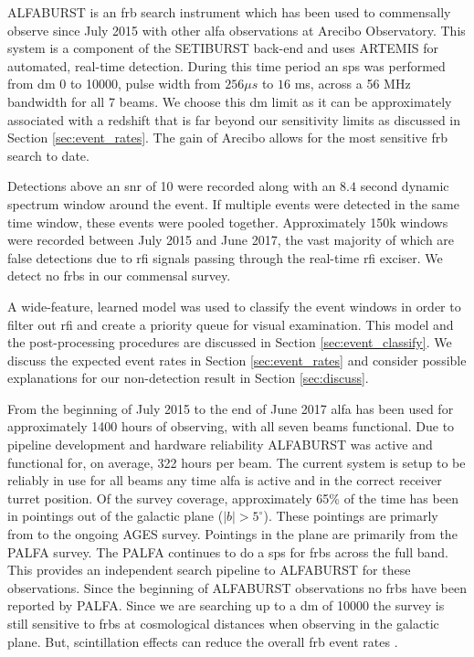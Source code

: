 \documentclass[a4paper,fleqn,usenatbib]{mnras}
\begin{document}
ALFABURST is an \gls{frb} search instrument which has been used to commensally
observe since July 2015 with other \gls{alfa} observations at Arecibo
Observatory. This system is a component of the SETIBURST back-end
\citep{2017ApJS..228...21C} and uses ARTEMIS \citep{2015MNRAS.452.1254K} for
automated, real-time detection. During this time period an \gls{sps} was
performed from \gls{dm} 0 to 10000, pulse width from $256 \mu s$ to $16$ ms,
across a 56 MHz bandwidth for all 7 beams. We choose this \gls{dm} limit as it
can be approximately associated with a redshift that is far beyond our
sensitivity limits as discussed in Section \ref{sec:event_rates}. The gain of
Arecibo allows for the most sensitive \gls{frb} search to date.

Detections above an \gls{snr} of 10 were recorded along with an $8.4$ second
dynamic spectrum window around the event. If multiple events were detected in
the same time window, these events were pooled together.  Approximately 150k
windows were recorded between July 2015 and June 2017, the vast majority of
which are false detections due to \gls{rfi} signals passing through the
real-time \gls{rfi} exciser. We detect no \glspl{frb} in our commensal survey.

A wide-feature, learned model was used to classify the event windows in order to
filter out \gls{rfi} and create a priority queue for visual examination. This
model and the post-processing procedures are discussed in Section
\ref{sec:event_classify}. We discuss the expected event rates in Section
\ref{sec:event_rates} and consider possible explanations for our non-detection
result in Section \ref{sec:discuss}.


From the beginning of July 2015 to the end of June 2017 \gls*{alfa} has been
used for approximately 1400 hours of observing, with all seven beams functional.
Due to pipeline development and hardware reliability ALFABURST was active and
functional for, on average, 322 hours per beam.  The current system is setup to
be reliably in use for all beams any time \gls*{alfa} is active and in the
correct receiver turret position. Of the survey coverage, approximately 65\% of
the time has been in pointings out of the galactic plane ($|b| > 5^{\circ}$).
These pointings are primarly from to the ongoing AGES survey.  Pointings in the
plane are primarily from the PALFA survey. The PALFA continues to do a \gls{sps}
for \glspl{frb} across the full band. This provides an independent search
pipeline to ALFABURST for these observations. Since the beginning of ALFABURST
observations no \glspl{frb} have been reported by PALFA.  Since we are searching
up to a \gls{dm} of 10000 the survey is still sensitive to \glspl{frb} at
cosmological distances when observing in the galactic plane. But, scintillation
effects can reduce the overall \gls{frb} event rates
\citep{2015MNRAS.451.3278M}.
\end{document}

